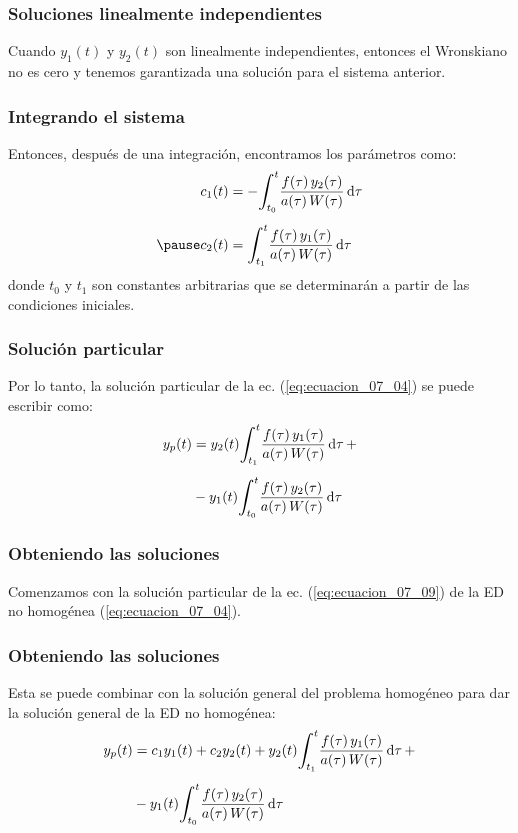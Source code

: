 \documentclass[12pt]{beamer}
\begin{document}
\begin{frame}
\frametitle{Soluciones linealmente independientes}
Cuando $y_{1} (t)$ y $y_{2} (t)$ son linealmente independientes, \pause entonces el Wronskiano no es cero y tenemos garantizada una solución para el sistema anterior.
\end{frame}
\begin{frame}
\frametitle{Integrando el sistema}
Entonces, después de una integración, encontramos los parámetros como:
\pause
\begin{eqnarray}
\begin{aligned}
c_{1} (t) &= - \scaleint{6ex}_{\bs t_{0}}^{t} \dfrac{f (\tau) \, y_{2} (\tau)}{a (\tau) \, W (\tau)} \dd{\tau} \\[0.5em] \pause
c_{2} (t) &= \scaleint{6ex}_{\bs t_{1}}^{t} \dfrac{f (\tau) \, y_{1} (\tau)}{a (\tau) \, W (\tau)} \dd{\tau}
\end{aligned}
\label{eq:ecuacion_07_08}
\end{eqnarray}
donde $t_{0}$ y $t_{1}$ son constantes arbitrarias que se determinarán a partir de las condiciones iniciales.
\end{frame}
\begin{frame}
\frametitle{Solución particular}
Por lo tanto, la solución particular de la ec. (\ref{eq:ecuacion_07_04}) se puede escribir como:
\pause
\begin{eqnarray}
\begin{aligned}
y_{p} (t) &= y_{2} (t) \scaleint{6ex}_{\bs t_{1}}^{t} \dfrac{f (\tau) \, y_{1} (\tau)}{a (\tau) \, W (\tau)} \dd{\tau} + \\[0.5em] 
&- y_{1} (t) \scaleint{6ex}_{\bs t_{0}}^{t} \dfrac{f (\tau) \, y_{2} (\tau)}{a (\tau) \, W (\tau)} \dd{\tau}
\end{aligned}
\label{eq:ecuacion_07_09}
\end{eqnarray}
\end{frame}
\begin{frame}
\frametitle{Obteniendo las soluciones}
Comenzamos con la solución particular de la ec. (\ref{eq:ecuacion_07_09}) de la ED no homogénea (\ref{eq:ecuacion_07_04}).
\end{frame}
\begin{frame}
\frametitle{Obteniendo las soluciones}Esta se puede combinar con la solución general del problema homogéneo para dar la solución general de la ED no homogénea:
\begin{eqnarray}
\begin{aligned}
y_{p} (t) &= c_{1} y_{1} (t) + c_{2} y_{2} (t) +  y_{2} (t) \scaleint{6ex}_{\bs t_{1}}^{t} \dfrac{f (\tau) \, y_{1} (\tau)}{a (\tau) \, W (\tau)} \dd{\tau} + \\[0.5em] 
&- y_{1} (t) \scaleint{6ex}_{\bs t_{0}}^{t} \dfrac{f (\tau) \, y_{2} (\tau)}{a (\tau) \, W (\tau)} \dd{\tau}
\label{eq:ecuacion_07_10}
\end{aligned}
\end{eqnarray}
\end{frame}
\end{document}
